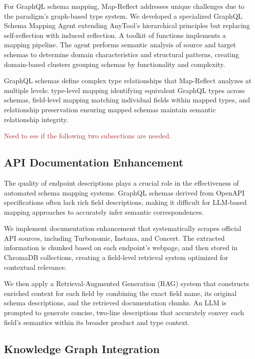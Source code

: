 \documentclass[sigconf, nonacm]{acmart}
\newcommand{\bg}[1]{\textcolor{brown}{#1}}
\begin{document}
For GraphQL schema mapping, Map-Reflect addresses unique challenges due to the paradigm's graph-based type system. We developed a specialized GraphQL Schema Mapping Agent extending AnyTool's hierarchical principles but replacing self-reflection with induced reflection. A toolkit of functions implements a mapping pipeline. The agent performs semantic analysis of source and target schemas to determine domain characteristics and structural patterns, creating domain-based clusters grouping schemas by functionality and complexity.

GraphQL schemas define complex type relationships that Map-Reflect analyzes at multiple levels: type-level mapping identifying equivalent GraphQL types across schemas, field-level mapping matching individual fields within mapped types, and relationship preservation ensuring mapped schemas maintain semantic relationship integrity.

\bg{Need to see if the following two subsections are needed.}
\subsection{API Documentation Enhancement}

The quality of endpoint descriptions plays a crucial role in the effectiveness of automated schema mapping systems. GraphQL schemas derived from OpenAPI specifications often lack rich field descriptions, making it difficult for LLM-based mapping approaches to accurately infer semantic correspondences.

We implement documentation enhancement that systematically scrapes official API sources, including Turbonomic, Instana, and Concert. The extracted information is chunked based on each endpoint's webpage, and then stored in ChromaDB collections, creating a field-level retrieval system optimized for contextual relevance.

We then apply a Retrieval-Augmented Generation (RAG) system that constructs enriched context for each field by combining the exact field name, its original schema descriptions, and the retrieved documentation chunks. An LLM is prompted to generate concise, two-line descriptions that accurately convey each field's semantics within its broader product and type context.

\subsection{Knowledge Graph Integration}
\end{document}

